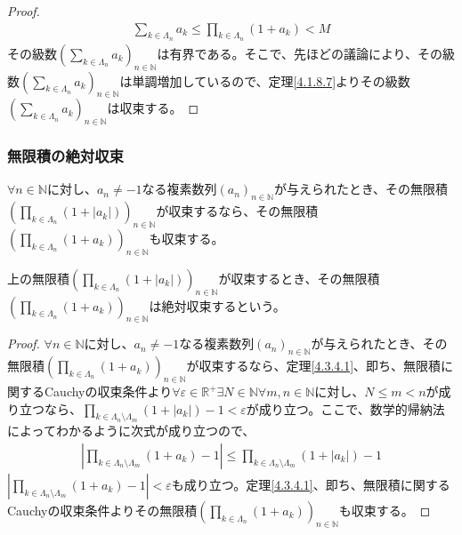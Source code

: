 \documentclass[dvipdfmx]{jsarticle}
\begin{document}
\begin{proof}
\begin{align*}
\sum_{k \in \varLambda_{n}} a_{k} \leq \prod_{k \in \varLambda_{n}} \left( 1 + a_{k} \right) < M
\end{align*}
その級数$\left( \sum_{k \in \varLambda_{n}} a_{k} \right)_{n \in \mathbb{N}}$は有界である。そこで、先ほどの議論により、その級数$\left( \sum_{k \in \varLambda_{n}} a_{k} \right)_{n \in \mathbb{N}}$は単調増加しているので、定理\ref{4.1.8.7}よりその級数$\left( \sum_{k \in \varLambda_{n}} a_{k} \right)_{n \in \mathbb{N}}$は収束する。
\end{proof}
\subsubsection{無限積の絶対収束}%
\begin{thm}\label{4.3.4.4}
$\forall n \in \mathbb{N}$に対し、$a_{n} \neq - 1$なる複素数列$\left( a_{n} \right)_{n \in \mathbb{N}}$が与えられたとき、その無限積$\left( \prod_{k \in \varLambda_{n}} \left( 1 + \left| a_{k} \right| \right) \right)_{n \in \mathbb{N}}$が収束するなら、その無限積$\left( \prod_{k \in \varLambda_{n}} \left( 1 + a_{k} \right) \right)_{n \in \mathbb{N}}$も収束する。
\end{thm}
\begin{dfn}
上の無限積$\left( \prod_{k \in \varLambda_{n}} \left( 1 + \left| a_{k} \right| \right) \right)_{n \in \mathbb{N}}$が収束するとき、その無限積$\left( \prod_{k \in \varLambda_{n}} \left( 1 + a_{k} \right) \right)_{n \in \mathbb{N}}$は絶対収束するという。
\end{dfn}
\begin{proof}
$\forall n \in \mathbb{N}$に対し、$a_{n} \neq - 1$なる複素数列$\left( a_{n} \right)_{n \in \mathbb{N}}$が与えられたとき、その無限積$\left( \prod_{k \in \varLambda_{n}} \left( 1 + a_{k} \right) \right)_{n \in \mathbb{N}}$が収束するなら、定理\ref{4.3.4.1}、即ち、無限積に関するCauchyの収束条件より$\forall\varepsilon \in \mathbb{R}^{+}\exists N \in \mathbb{N}\forall m,n \in \mathbb{N}$に対し、$N \leq m < n$が成り立つなら、$\prod_{k \in \varLambda_{n} \setminus \varLambda_{m}} \left( 1 + \left| a_{k} \right| \right) - 1 < \varepsilon$が成り立つ。ここで、数学的帰納法によってわかるように次式が成り立つので、
\begin{align*}
\left| \prod_{k \in \varLambda_{n} \setminus \varLambda_{m}} \left( 1 + a_{k} \right) - 1 \right| \leq \prod_{k \in \varLambda_{n} \setminus \varLambda_{m}} \left( 1 + \left| a_{k} \right| \right) - 1
\end{align*}
$\left| \prod_{k \in \varLambda_{n} \setminus \varLambda_{m}} \left( 1 + a_{k} \right) - 1 \right| < \varepsilon$も成り立つ。定理\ref{4.3.4.1}、即ち、無限積に関するCauchyの収束条件よりその無限積$\left( \prod_{k \in \varLambda_{n}} \left( 1 + a_{k} \right) \right)_{n \in \mathbb{N}}$も収束する。
\end{proof}
\end{document}
